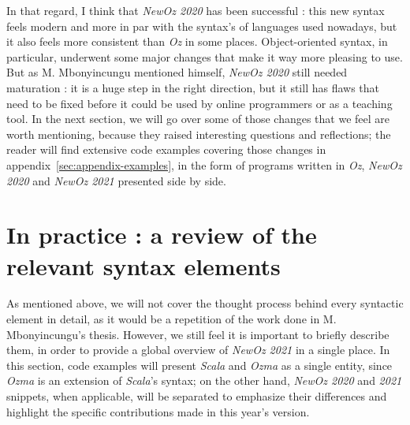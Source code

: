 In that regard, I think that \textit{NewOz 2020} has been successful : this new syntax feels modern and more in par with the syntax's of languages used nowadays, but it also feels more consistent than \textit{Oz} in some places.
Object-oriented syntax, in particular, underwent some major changes that make it way more pleasing to use.
But as M. Mbonyincungu mentioned himself, \textit{NewOz 2020} still needed maturation : it is a huge step in the right direction, but it still has flaws that need to be fixed before it could be used by online programmers or as a teaching tool.
In the next section, we will go over some of those changes that we feel are worth mentioning, because they raised interesting questions and reflections;
the reader will find extensive code examples covering those changes in appendix~\ref{sec:appendix-examples}, in the form of programs written in \textit{Oz}, \textit{NewOz 2020} and \textit{NewOz 2021} presented side by side.

\section{In practice : a review of the relevant syntax elements}\label{sec:ch2-review}
As mentioned above, we will not cover the thought process behind every syntactic element in detail, as it would be a repetition of the work done in M. Mbonyincungu's thesis.
However, we still feel it is important to briefly describe them, in order to provide a global overview of \textit{NewOz 2021} in a single place.\newline
In this section, code examples will present \textit{Scala} and \textit{Ozma} as a single entity, since \textit{Ozma} is an extension of \textit{Scala}'s syntax;
on the other hand, \textit{NewOz 2020} and \textit{2021} snippets, when applicable, will be separated to emphasize their differences and highlight the specific contributions made in this year's version.

